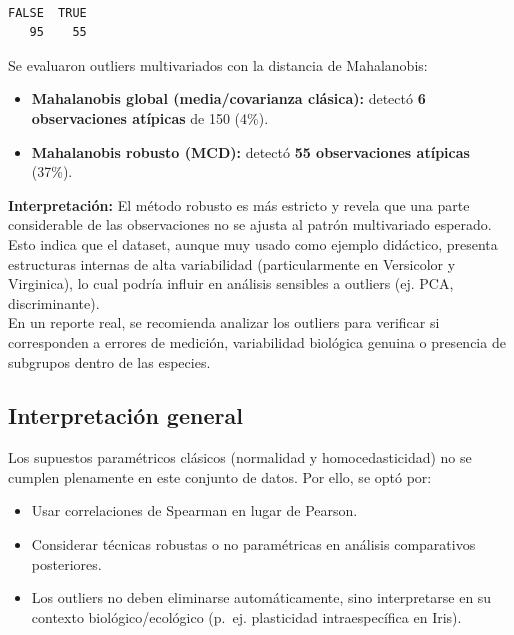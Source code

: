 \documentclass[
  spanish,
  11pt,
  a4paper,
  DIV=11,
  numbers=noendperiod]{scrartcl}
\providecommand{\tightlist}{%
  \setlength{\itemsep}{0pt}\setlength{\parskip}{0pt}}
\begin{document}
\begin{verbatim}

FALSE  TRUE 
   95    55 
\end{verbatim}

Se evaluaron outliers multivariados con la distancia de Mahalanobis:

\begin{itemize}
\tightlist
\item
  \textbf{Mahalanobis global (media/covarianza clásica):} detectó
  \textbf{6 observaciones atípicas} de 150 (4\%).\\
\item
  \textbf{Mahalanobis robusto (MCD):} detectó \textbf{55 observaciones
  atípicas} (37\%).
\end{itemize}

\textbf{Interpretación:} El método robusto es más estricto y revela que
una parte considerable de las observaciones no se ajusta al patrón
multivariado esperado. Esto indica que el dataset, aunque muy usado como
ejemplo didáctico, presenta estructuras internas de alta variabilidad
(particularmente en Versicolor y Virginica), lo cual podría influir en
análisis sensibles a outliers (ej. PCA, discriminante).\\
En un reporte real, se recomienda analizar los outliers para verificar
si corresponden a errores de medición, variabilidad biológica genuina o
presencia de subgrupos dentro de las especies.

\subsection{Interpretación general}\label{interpretaciuxf3n-general-2}

Los supuestos paramétricos clásicos (normalidad y homocedasticidad) no
se cumplen plenamente en este conjunto de datos. Por ello, se optó por:

\begin{itemize}
\item
  Usar correlaciones de Spearman en lugar de Pearson.
\item
  Considerar técnicas robustas o no paramétricas en análisis
  comparativos posteriores.
\item
  Los outliers no deben eliminarse automáticamente, sino interpretarse
  en su contexto biológico/ecológico (p.~ej. plasticidad intraespecífica
  en Iris).
\end{itemize}
\end{document}
